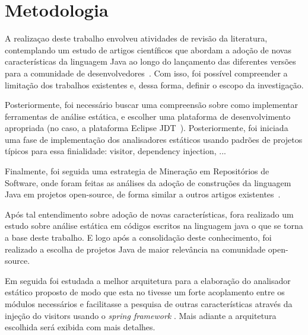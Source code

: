 %


\section{Metodologia}
    
    A realizaçao deste trabalho envolveu atividades de revisão da literatura, contemplando um estudo 
    de artigos científicos que abordam a adoção de novas características da linguagem Java ao longo do 
    lançamento das diferentes versões para a comunidade de desenvolvedores~\cite{Schaefer:ACM2009, Dyer:2013, Parnin:ACM2011, Overbey:2009, Dyer:ACM2014, Bracha:ACM1998, bonifacio:scam2015}. Com isso, foi 
    possível compreender a limitação dos trabalhos existentes e, dessa forma, definir o escopo da 
    investigação. 
    
    Posteriormente, foi necessário buscar uma compreensão sobre como implementar ferramentas de 
    análise estática, e escolher uma plataforma de desenvolvimento apropriada (no caso, a plataforma 
    Eclipse JDT~\cite{EclipseJDT}). Posteriormente, foi iniciada uma fase de implementação dos analisadores 
    estáticos usando padrões de projetos típicos para essa finialidade: visitor, dependency injection, ...
    
     Finalmente, foi seguida uma estrategia de Mineração em Repositórios de Software, onde foram 
     feitas as análises da adoção de construções da linguagem Java em projetos open-source, de forma 
     similar a outros artigos existentes~\cite{Schaefer:ACM2010,pinto-jss:2015,donovan:2004,dinklage:2004, Schaefer:ACM2009, Schaefer:ACM2010, Overbey:2009, Wichmann95industrialperspective, Ayewah:2008:USA:1439186.1439221, bracha1998gj}. 
     
	
	Após tal entendimento sobre adoção de novas características, fora realizado um estudo sobre análise estática em códigos escritos na linguagem java o que se torna a base deste trabalho. E logo após a consolidação deste conhecimento, foi realizado a escolha de projetos Java de maior relevância na comunidade open-source.
	
	Em seguida foi estudada a melhor arquitetura para a elaboração do analisador estático proposto de modo que esta no tivesse um forte acoplamento entre os módulos necessários e facilitasse a pesquisa de outras características através da injeção do visitors \cite{Gamma:1995} usando o \textit{spring framework} \cite{SPRING_REF}. Mais adiante a arquitetura escolhida será exibida com mais detalhes.